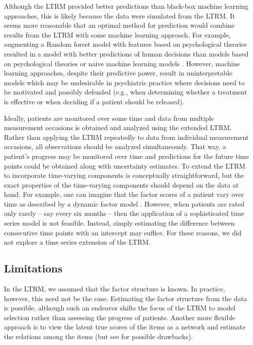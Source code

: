 \documentclass[a4paper]{article}
\begin{document}
Although the LTRM provided better predictions than black-box machine learning approaches, this is likely because the data were simulated from the LTRM. It seems more reasonable that an optimal method for prediction would combine results from the LTRM with some machine learning approach. For example, augmenting a Random forest model with features based on psychological theories resulted in a model with better predictions of human decisions than models based on psychological theories or naive machine learning models \cite{plonsky2019predicting, plonsky2017psychological}. However, machine learning approaches, despite their predictive power, result in uninterpretable models which may be undesirable in psychiatric practice where decisions need to be motivated and possibly defended (e.g., when determining whether a treatment is effective or when deciding if a patient should be released).

Ideally, patients are monitored over some time and data from multiple measurement occasions is obtained and analyzed using the extended LTRM. Rather than applying the LTRM repeatedly to data from individual measurement occasions, all observations should be analyzed simultaneously. That way, a patient's progress may be monitored over time and predictions for the future time points could be obtained along with uncertainty estimates. To extend the LTRM to incorporate time-varying components is conceptually straightforward, but the exact properties of the time-varying components should depend on the data at hand. For example, one can imagine that the factor scores of a patient vary over time as described by a dynamic factor model \cite{molenaar1985dynamic, forni2000generalized}. However, when patients are rated only rarely -- say every six months -- then the application of a sophisticated time series model is not feasible. Instead, simply estimating the difference between consecutive time points with an intercept may suffice. For these reasons, we did not explore a time series extension of the LTRM.

\subsection*{Limitations}

In the LTRM, we assumed that the factor structure is known. In practice, however, this need not be the case. Estimating the factor structure from the data is possible, although such an endeavor shifts the focus of the LTRM to model selection rather than assessing the progress of patients. Another more flexible approach is to view the latent true scores of the items as a network and estimate the relations among the items (but see  for possible drawbacks).
\end{document}
